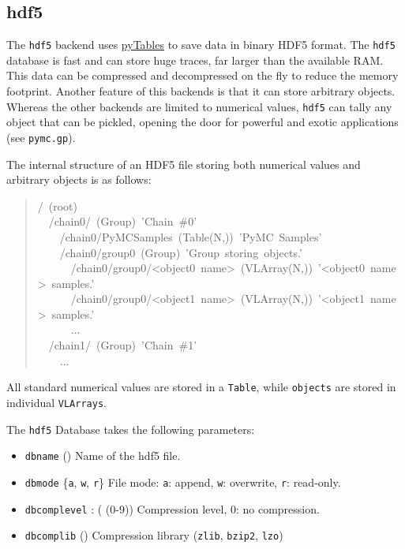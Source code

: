 
\hypertarget{hdf5}{}
\subsection*{hdf5}

The \texttt{hdf5} backend uses \href{http://www.pytables.org/moin}{pyTables} to save data in binary HDF5 format. 
The \texttt{hdf5} database is fast and can store huge traces, far larger than the 
available RAM. This data can be compressed and decompressed on the fly to 
reduce the memory footprint. 
Another feature of this backends is that it can store arbitrary objects. 
Whereas the other backends are limited to numerical values, \texttt{hdf5} can 
tally any object that can be pickled, opening the door for powerful and
exotic applications (see \texttt{pymc.gp}).

The internal structure of an HDF5 file storing both numerical values and 
arbitrary objects is as follows:
\begin{quote}{\ttfamily \raggedright \noindent
/~(root)~\\
~~/chain0/~(Group)~'Chain~{\#}0'~\\
~~~~/chain0/PyMCSamples~(Table(N,))~'PyMC~Samples'~\\
~~~~/chain0/group0~(Group)~'Group~storing~objects.'~\\
~~~~~~/chain0/group0/<object0~name>~(VLArray(N,))~'<object0~name>~samples.'~\\
~~~~~~/chain0/group0/<object1~name>~(VLArray(N,))~'<object1~name>~samples.'~\\
~~~~~~...~\\
~~/chain1/~(Group)~'Chain~{\#}1'~\\
~~~~...
}\end{quote}

All standard numerical values are stored in a \texttt{Table}, while \texttt{objects}
are stored in individual \texttt{VLArrays}.

The \texttt{hdf5} Database takes the following parameters:
\begin{itemize}
\item {} 
\texttt{dbname} () Name of the hdf5 file.

\item {} 
\texttt{dbmode} {\{}\texttt{a}, \texttt{w}, \texttt{r}{\}} File mode: \texttt{a}: append, \texttt{w}: overwrite, 
\texttt{r}: read-only.

\item {} 
\texttt{dbcomplevel} : ( (0-9)) Compression level, 0: no compression.

\item {} 
\texttt{dbcomplib} () Compression library (\texttt{zlib}, \texttt{bzip2}, \texttt{lzo})

\end{itemize}

